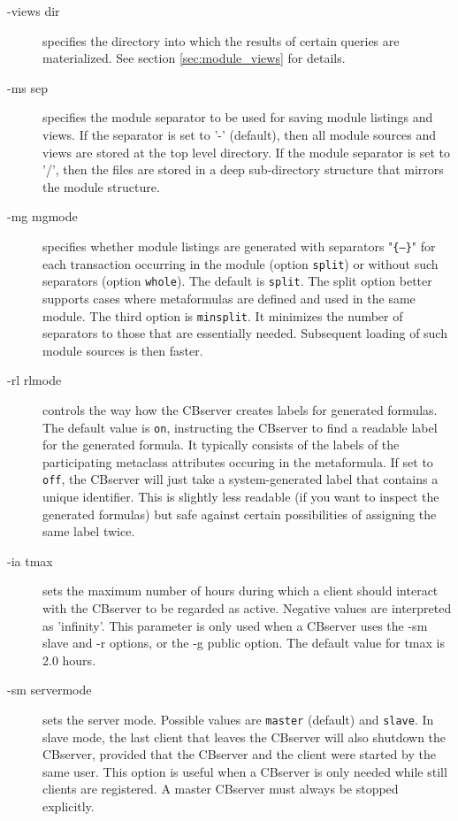 \begin{description}
\item[-views dir] specifies the directory into which the results of certain
queries are materialized. See section \ref{sec:module_views} for details.

\item[-ms sep] specifies the module separator to be used for saving module listings
and views. If the separator is set to '-'  (default), then all module sources and
views are stored at the top level directory. If the module separator is set to '/',
then the files are stored in a deep sub-directory structure that mirrors the module
structure.

\item[-mg mgmode] specifies whether module listings are generated with separators
"{\tt \{---\}}" for each transaction occurring in the module (option {\tt split}) or
without such separators
(option {\tt whole}). The default is {\tt split}. The split option better supports
cases where metaformulas are defined and used in the same module. The third option
is {\tt minsplit}. It minimizes the number of separators to those that are essentially needed.
Subsequent loading of such module sources is then faster.

\item[-rl rlmode] controls the way how the CBserver creates labels for generated formulas.
The default value is {\tt on}, instructing the CBserver to find a readable 
label for the generated formula. It typically consists of the labels of
the participating metaclass attributes occuring in the metaformula. 
If set to {\tt off}, the CBserver will just take a system-generated label that contains
a unique identifier. This is slightly less readable (if you want to inspect
the generated formulas) but safe against certain possibilities of assigning
the same label twice.

\item[-ia tmax] sets the maximum number of hours during which a client should
interact with the CBserver to be regarded as active. Negative values
are interpreted as 'infinity'. This parameter is only used when a CBserver
uses the -sm slave and -r options, or the -g public option.
The default value for tmax is 2.0 hours.

\item[-sm servermode] sets the server mode. Possible values are
{\tt master} (default) and {\tt slave}. In slave mode, the last client that
leaves the CBserver will also shutdown the CBserver, provided that the CBserver
and the client were started by the same user. This option is useful when
a CBserver is only needed while still clients are registered. A master
CBserver must always be stopped explicitly.


\end{description}

